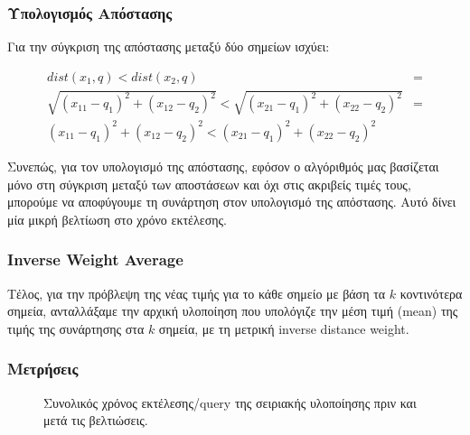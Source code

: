\documentclass[11pt]{scrartcl} %
\begin{document}
\subsubsection{Υπολογισμός Απόστασης}

Για την σύγκριση της απόστασης μεταξύ δύο σημείων ισχύει:

\begin{equation}
    \begin{split}
        dist(x_1, q) < dist(x_2, q) &= \\
        \sqrt{(x_{11} - q_1)^2 + (x_{12} - q_2)^2} < \sqrt{(x_{21} - q_1)^2 + (x_{22} - q_2)^2} &= \\
        {(x_{11} - q_1)^2 + (x_{12} - q_2)^2} < {(x_{21} - q_1)^2 + (x_{22} - q_2)^2}
    \end{split}
\end{equation}

Συνεπώς, για τον υπολογισμό της απόστασης, εφόσον ο αλγόριθμός μας
βασίζεται μόνο στη σύγκριση μεταξύ των αποστάσεων και όχι στις ακριβείς τιμές τους, μπορούμε 
να αποφύγουμε τη συνάρτηση  στον υπολογισμό της απόστασης. 
Αυτό δίνει μία μικρή βελτίωση στο χρόνο εκτέλεσης.

\subsubsection{Inverse Weight Average}

Τέλος, για την πρόβλεψη της νέας τιμής για το κάθε σημείο με βάση τα $k$ κοντινότερα 
σημεία, ανταλλάξαμε την αρχική υλοποίηση που υπολόγιζε την μέση τιμή (mean) της τιμής 
της συνάρτησης στα $k$ σημεία, με τη μετρική inverse distance weight.

\subsubsection{Μετρήσεις}

\begin{figure}[H]
    \begin{center}
    \end{center}
    \caption{Συνολικός χρόνος εκτέλεσης/query της σειριακής υλοποίησης πριν και μετά τις βελτιώσεις.}
    \label{fig:before_after_times}
\end{figure}
\end{document}
